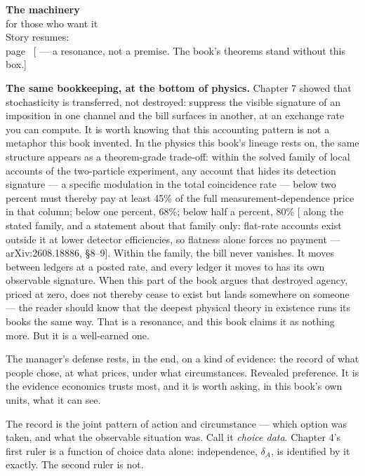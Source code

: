 \begin{machinery}{\textbf{The machinery}\\for those who want it\\[3pt]{\color{muted}Story resumes:\\page~\pageref{ch14}}}
{\sffamily\fontsize{8.6}{12.2}\selectfont\color{trackc}[ --- a resonance, not a premise. The book's theorems
stand without this box.]}

\textbf{The same bookkeeping, at the bottom of physics.} Chapter 7 showed
that stochasticity is transferred, not destroyed: suppress the visible
signature of an imposition in one channel and the bill surfaces in
another, at an exchange rate you can compute. It is worth knowing that
this accounting pattern is not a metaphor this book invented. In the
physics this book's lineage rests on, the same structure appears as a
theorem-grade trade-off: within the solved family of local accounts
of the two-particle experiment, any account that hides its detection
signature --- a specific modulation in the total coincidence rate ---
below two percent must thereby pay at least 45\% of the full
measurement-dependence price in that column; below one percent, 68\%;
below half a percent, 80\% {[} along the stated family, and a statement about that
family only: flat-rate accounts exist outside it at lower detector
efficiencies, so flatness alone forces no payment --- arXiv:2608.18886,
§8--9{]}. Within the family, the bill never vanishes. It moves between
ledgers at a posted rate, and every
ledger it moves to has its own observable signature. When this part of
the book argues that destroyed agency, priced at zero, does not
thereby cease to exist but lands somewhere on someone --- the reader
should know that the deepest physical theory in existence runs its books
the same way. That is a resonance, and this book claims it as nothing
more. But it is a well-earned one.


The manager's defense rests, in the end, on a kind of evidence: the
record of what people chose, at what prices, under what circumstances.
Revealed preference. It is the evidence economics trusts most, and it
is worth asking, in this book's own units, what it can see.

The record is the joint pattern of action and circumstance --- which
option was taken, and what the observable situation was. Call it
\emph{choice data}. Chapter 4's first ruler is a function of choice data
alone: independence, \(\delta_A\), is identified by it exactly. The second
ruler is not.



\end{machinery}
